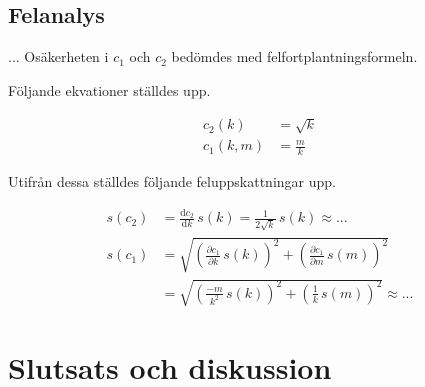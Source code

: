 \documentclass[a4paper,12pt]{article}
\newcommand*{\dd}{\mathrm{d}}
\begin{document}
\subsection{Felanalys}

... Osäkerheten i $c_1$ och $c_2$ bedömdes med felfortplantningsformeln.

Följande ekvationer ställdes upp.

\begin{align}
  c_2(k) &= \sqrt{k} \\
  c_1(k, m) &= \frac{m}{k}
\end{align} 

Utifrån dessa ställdes följande feluppskattningar upp.

\begin{align}
  s(c_2) &= \frac{\dd c_2}{\dd k} \, s(k) = \frac{1}{2\sqrt{k}} \, s(k) \approx ...\\
  s(c_1) &= \sqrt{\left( \frac{\partial c_1}{\partial k} \, s(k) \right)^2 + \left( \frac{\partial c_1}{\partial m} \, s(m) \right)^2} \nonumber \\
         &= \sqrt{\left( \frac{-m}{k^2} \, s(k) \right)^2 + \left( \frac{1}{k} \, s(m) \right)^2} \approx ...
\end{align}

\section{Slutsats och diskussion}
\end{document}
